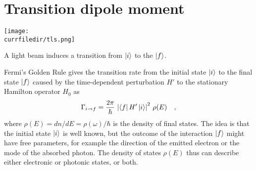 \section{Transition dipole moment}

\begin{marginfigure}
\texttt{[image: \\currfiledir/tls.png]}
\caption{A light beam induces a transition from $\ket{i}$ to the  $\ket{f}$.}
\end{marginfigure}

Fermi's Golden Rule gives the transition rate from the initial state $\ket{i}$ to the final state $\ket{f}$ caused by the time-dependent perturbation $H'$ to the stationary Hamilton operator $H_0$ as
\[
 \Gamma_{i \rightarrow f} = \frac{2 \pi}{\hbar} \, \left| \bra{f} H' \ket{i} \right|^2 \, \rho(E) \quad ,
\]
where  $\rho(E) = d n / d E = \rho(\omega) / \hbar$ is the density of final states. The idea is that the initial state  $\ket{i}$ is well known, but the outcome of the interaction $\ket{f}$ might have free parameters, for example the direction of the emitted electron or the mode of the absorbed photon. The density of states   $\rho(E)$ thus can describe either electronic or photonic states, or both.




